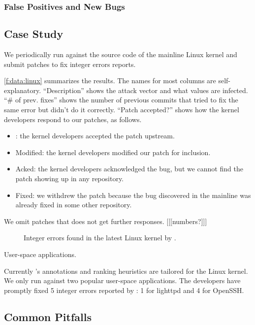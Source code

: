 \subsubsection{False Positives and New Bugs}


\subsection{Case Study}

We periodically run \sys against the source code of the mainline
Linux kernel and submit patches to fix integer errors \sys reports.

\autoref{f:data:linux} summarizes the results.  The names for most
columns are self-explanatory.  ``Description'' shows the attack
vector and what values are infected.  ``\# of prev. fixes'' shows
the number of previous commits that tried to fix the same error but
didn't do it correctly.  ``Patch accepted?'' shows how the kernel
developers respond to our patches, as follows.
\begin{itemize}
\item
\ok: the kernel developers accepted the patch upstream.
\item
Modified: the kernel developers modified our patch for inclusion.
\item
Acked: the kernel developers acknowledged the bug,
but we cannot find the patch showing up in any repository.
\item
Fixed: we withdrew the patch because the bug discovered in the
mainline was already fixed in some other repository.
\end{itemize}
We omit patches that does not get further responses. [[[numbers?]]]

\begin{figure*}
\centering
\footnotesize

\caption{Integer errors found in the latest Linux kernel by \sys.}
\label{f:data:linux}
\end{figure*}

User-space applications.

Currently \sys's annotations and ranking heuristics are tailored
for the Linux kernel.  We only run \sys against two popular user-space
applications.  The developers have promptly fixed 5 integer errors
reported by \sys: 1 for lighttpd and 4 for OpenSSH.

\subsection{Common Pitfalls}

